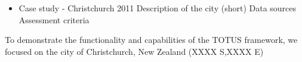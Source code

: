 \begin{itemize} 
	\item Case study - Christchurch 2011
	\subitem Description of the city (short)
	\subitem Data sources
	\subitem Assessment criteria
\end{itemize}
To demonstrate the functionality and capabilities of the TOTUS framework, we focused on the city of Christchurch, New Zealand (XXXX S,XXXX E)